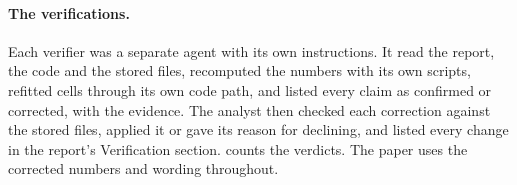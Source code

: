 \begin{table}[ht]
\centering\footnotesize\setlength{\tabcolsep}{4pt}

\caption{The independent verifications of the Part 11 analyses, counted from the verifiers' own records . ``Corrected'': the verifier changed a number, narrowed a statement or rejected a reading; ``unsupported'': a claim the records do not support, counted apart from the corrections; ``omissions'': further problems it listed that were not tied to one claim. The reports are in , each next to its verification record (\texttt{.md} and \texttt{.json}). Generated by  (\texttt{tab\_verif}) from the \texttt{VERIFY\_*.json} files.}
\label{tab:verif}
\end{table}

\paragraph{The verifications.} Each verifier was a separate agent with its own instructions. It read the report, the code and the stored files, recomputed the numbers with its own scripts, refitted cells through its own code path, and listed every claim as confirmed or corrected, with the evidence. The analyst then checked each correction against the stored files, applied it or gave its reason for declining, and listed every change in the report's Verification section.  counts the verdicts. The paper uses the corrected numbers and wording throughout.
